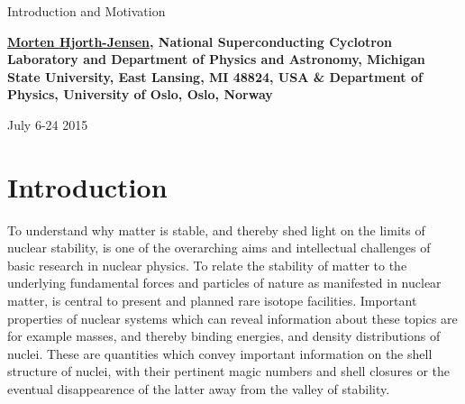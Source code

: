 \documentclass[%
oneside,                 %
final,                   %
10pt]{article}
\begin{document}






\thispagestyle{empty}

\begin{center}
{\LARGE\bf
\begin{spacing}{1.25}
Introduction and Motivation
\end{spacing}
}
\end{center}


\begin{center}
{\bf \href{{http://computationalphysics.no}}{Morten Hjorth-Jensen}, National Superconducting Cyclotron Laboratory and Department of Physics and Astronomy, Michigan State University, East Lansing, MI 48824, USA {\&} Department of Physics, University of Oslo, Oslo, Norway${}^{}$} \\ [0mm]
\end{center}

\begin{center}
\end{center}
    

\begin{center} %
July 6-24 2015
\end{center}

\vspace{1cm}


\tableofcontents


\vspace{1cm} %




\section*{Introduction}

To understand why matter is stable, and thereby shed light on the limits of 
nuclear stability, is one of the 
overarching aims and intellectual challenges 
of basic research in nuclear physics. To relate the stability of matter
to the underlying fundamental forces and particles of nature as manifested in nuclear matter, is central
to present and planned rare isotope facilities. 
Important properties of nuclear systems which can reveal information about these topics 
are for example masses, and thereby binding energies, and density distributions of nuclei.  
These are quantities which convey important information on 
the shell structure of nuclei, with their 
pertinent magic numbers and shell closures or the  eventual disappearence of the latter 
away from  the valley of stability.
\end{document}
